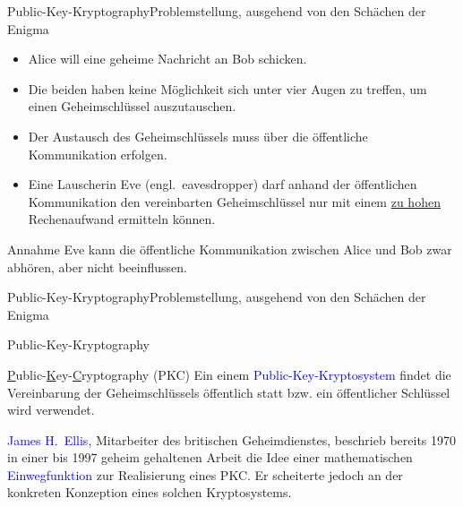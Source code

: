 \documentclass{beamer}
\newcommand{\tb}[1]{{\textcolor{blue}{#1}}}
\theoremstyle{plain}
\begin{document}
\begin{frame}{Public-Key-Kryptography}{Problemstellung, ausgehend von den Schächen der Enigma} 

\begin{itemize}[<+->]
 \item Alice will eine geheime Nachricht an Bob schicken. 
 \item Die beiden haben keine Möglichkeit sich unter vier Augen zu treffen, um einen Geheimschlüssel auszutauschen.
 \item Der Austausch des Geheimschlüssels muss über die öffentliche Kommunikation erfolgen. 
 \item Eine Lauscherin Eve (engl.~eavesdropper) darf anhand der öffentlichen Kommunikation den vereinbarten Geheimschlüssel nur mit einem \underline{zu hohen} Rechenaufwand ermitteln können. 
\end{itemize}
\pause
\vspace{0.5cm}
\begin{exampleblock}{Annahme}
 Eve kann die öffentliche Kommunikation zwischen Alice und Bob zwar abhören, aber nicht beeinflussen.
\end{exampleblock}
 
\end{frame}

\begin{frame}{Public-Key-Kryptography}{Problemstellung, ausgehend von den Schächen der Enigma}

\begin{center}
\end{center}
\end{frame}


\begin{frame}{Public-Key-Kryptography}{~} 
 \begin{block}{\underline Public-\underline Key-\underline Cryptography (PKC)}
  Ein einem \tb{Public-Key-Kryptosystem} findet die Vereinbarung der Geheimschlüssels öffentlich statt bzw. ein öffentlicher Schlüssel wird verwendet.
 \end{block}
 \pause
 \vspace{0.5cm}
 \tb{James H.~Ellis}, Mitarbeiter des britischen Geheimdienstes, beschrieb bereits 1970 in einer bis 1997 geheim gehaltenen Arbeit die Idee einer mathematischen \tb{Einwegfunktion} zur Realisierung eines PKC. Er scheiterte jedoch an der konkreten Konzeption eines solchen Kryptosystems.
\end{frame}
\end{document}
